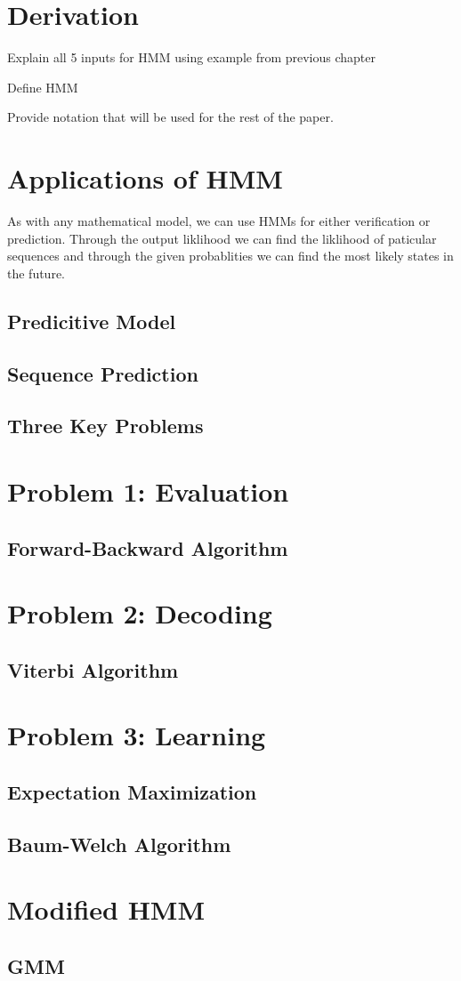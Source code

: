 \section{Derivation}

Explain all 5 inputs for HMM using example from previous chapter

\begin{definition}
\label{}
Define HMM
\end{definition}

Provide notation that will be used for the rest of the paper.


\section{Applications of HMM}
As with any mathematical model, we can use HMMs for either verification or prediction. Through the output liklihood we can find the liklihood of paticular sequences and through the given probablities we can find the most likely states in the future. 

\subsection{Predicitive Model}

\subsection{Sequence Prediction}
\subsection{Three Key Problems}


\section{Problem 1: Evaluation}
\subsection{Forward-Backward Algorithm}


\section{Problem 2: Decoding}
\subsection{Viterbi Algorithm}


\section{Problem 3: Learning}
\subsection{Expectation Maximization}
\subsection{Baum-Welch Algorithm}


\section{Modified HMM}
\subsection{GMM}




